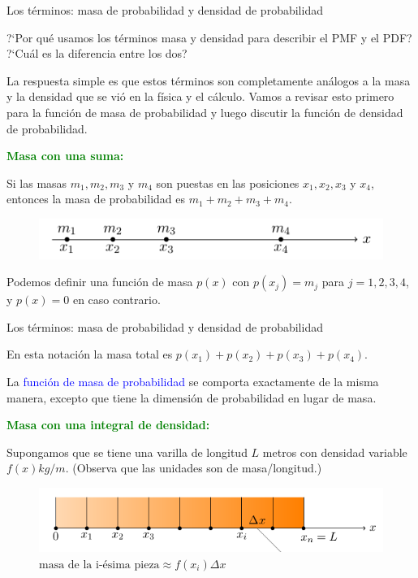 \documentclass[10pt]{beamer}
\begin{document}
\begin{frame}{Los t\'erminos: masa de probabilidad y densidad de probabilidad}
\small{ ?`Por qu\'e usamos los t\'erminos masa y densidad para describir el PMF y el PDF? ?`Cu\'al es la diferencia entre los dos? 

La respuesta simple es que estos t\'erminos son completamente an\'alogos a la masa y la densidad que se vi\'o en la f\'isica y el c\'alculo. Vamos a revisar esto primero para la funci\'on de masa de probabilidad y luego discutir la funci\'on de densidad de probabilidad.

\textcolor{green}{\textbf{Masa con una suma:}}

Si las masas $m_1, m_2, m_3$ y $m_4$ son puestas en las posiciones $x_1, x_2, x_3$ y $x_4$, entonces la masa de probabilidad es  $m_1 + m_2 + m_3 + m_4.$

\begin{figure}[ht]
	\centering
	\includegraphics[scale=.4]{G3.png}
\end{figure}

Podemos definir una funci\'on de masa $p(x)$ con $p(x_j) = m_j$ para $j = 1, 2, 3, 4$, y $p(x) = 0$ en caso contrario. 
}
\end{frame}

\begin{frame}{Los t\'erminos: masa de probabilidad y densidad de probabilidad}
\small{En esta notaci\'on la masa total es $p(x_1) + p(x_2) + p(x_3) + p (x_4)$.
	
La \textcolor{blue}{funci\'on de masa de probabilidad} se comporta exactamente de la misma manera, excepto que tiene la dimensi\'on de probabilidad en lugar de masa.

\textcolor{green}{\textbf{Masa con una integral de densidad:}}

Supongamos que se tiene una varilla de longitud $L$ metros con densidad variable $f(x)kg/m$. (Observa que las unidades son de masa/longitud.)

\begin{figure}[ht]
	\centering
	\includegraphics[scale=.4]{G4.png}
	\hspace{6.5cm} $\text{masa de la i-\'esima pieza} \approx f(x_i)\Delta x$
\end{figure}
}

\end{frame}
\end{document}
